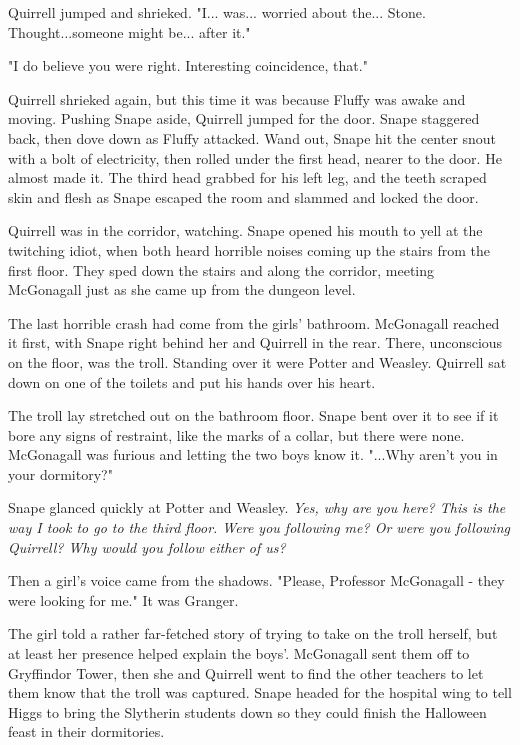 Quirrell jumped and shrieked. "I... was... worried about the... Stone. Thought...someone might be... after it."

"I do believe you were right. Interesting coincidence, that."

Quirrell shrieked again, but this time it was because Fluffy was awake and moving. Pushing Snape aside, Quirrell jumped for the door. Snape staggered back, then dove down as Fluffy attacked. Wand out, Snape hit the center snout with a bolt of electricity, then rolled under the first head, nearer to the door. He almost made it. The third head grabbed for his left leg, and the teeth scraped skin and flesh as Snape escaped the room and slammed and locked the door.

Quirrell was in the corridor, watching. Snape opened his mouth to yell at the twitching idiot, when both heard horrible noises coming up the stairs from the first floor. They sped down the stairs and along the corridor, meeting McGonagall just as she came up from the dungeon level.

The last horrible crash had come from the girls' bathroom. McGonagall reached it first, with Snape right behind her and Quirrell in the rear. There, unconscious on the floor, was the troll. Standing over it were Potter and Weasley. Quirrell sat down on one of the toilets and put his hands over his heart.

The troll lay stretched out on the bathroom floor. Snape bent over it to see if it bore any signs of restraint, like the marks of a collar, but there were none. McGonagall was furious and letting the two boys know it. "...Why aren't you in your dormitory?"

Snape glanced quickly at Potter and Weasley. \emph{Yes, why are you here? This is the way I took to go to the third floor. Were you following me? Or were you following Quirrell? Why would you follow either of us?}

Then a girl's voice came from the shadows. "Please, Professor McGonagall - they were looking for me." It was Granger.

The girl told a rather far-fetched story of trying to take on the troll herself, but at least her presence helped explain the boys'. McGonagall sent them off to Gryffindor Tower, then she and Quirrell went to find the other teachers to let them know that the troll was captured. Snape headed for the hospital wing to tell Higgs to bring the Slytherin students down so they could finish the Halloween feast in their dormitories.

